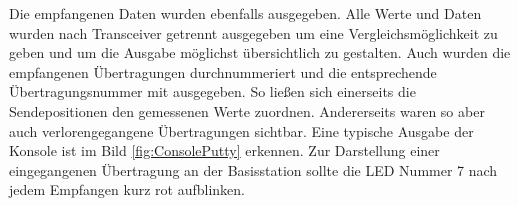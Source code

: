 Die empfangenen Daten wurden ebenfalls ausgegeben. 
Alle Werte und Daten wurden nach Transceiver getrennt ausgegeben um eine Vergleichsmöglichkeit zu geben und um die Ausgabe möglichst übersichtlich zu gestalten.
Auch wurden die empfangenen Übertragungen durchnummeriert und die entsprechende Übertragungsnummer mit ausgegeben. So ließen sich einerseits die Sendepositionen den gemessenen Werte zuordnen. Andererseits waren so aber auch  verlorengegangene  Übertragungen sichtbar. Eine typische Ausgabe der Konsole ist im Bild \ref{fig:ConsolePutty} erkennen. Zur Darstellung einer eingegangenen Übertragung an der Basisstation sollte die LED Nummer 7 nach jedem Empfangen kurz rot aufblinken. %




